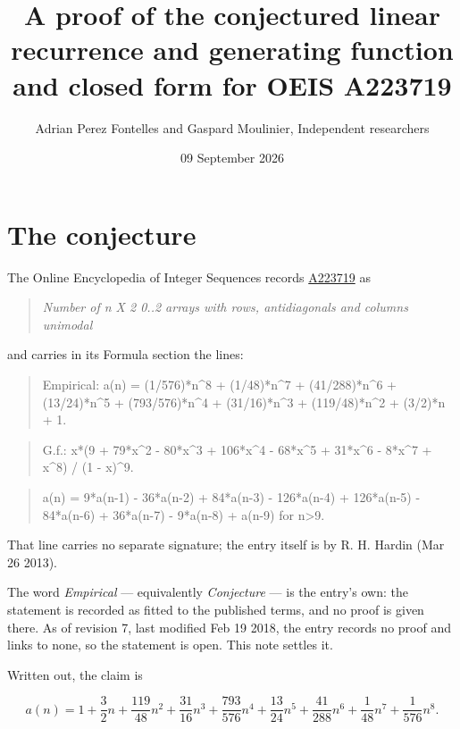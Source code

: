 \documentclass[11pt]{article}
\title{A proof of the conjectured linear recurrence and generating function and closed form for OEIS A223719}
\author{Adrian Perez Fontelles and Gaspard Moulinier, Independent researchers}
\date{09 September 2026}
\theoremstyle{definition}
\begin{document}
\maketitle
\section{The conjecture}

The Online Encyclopedia of Integer Sequences records \href{https://oeis.org/A223719}{A223719} as

\begin{quote}\itshape Number of n X 2 0..2 arrays with rows, antidiagonals and columns unimodal\end{quote}

and carries in its Formula section the lines:

\begin{quote}\ttfamily Empirical: a(n) = (1/576)*n\textasciicircum{}8 + (1/48)*n\textasciicircum{}7 + (41/288)*n\textasciicircum{}6 + (13/24)*n\textasciicircum{}5 + (793/576)*n\textasciicircum{}4 + (31/16)*n\textasciicircum{}3 + (119/48)*n\textasciicircum{}2 + (3/2)*n + 1.\end{quote}

\begin{quote}\ttfamily G.f.: x*(9 + 79*x\textasciicircum{}2 - 80*x\textasciicircum{}3 + 106*x\textasciicircum{}4 - 68*x\textasciicircum{}5 + 31*x\textasciicircum{}6 - 8*x\textasciicircum{}7 + x\textasciicircum{}8) / (1 - x)\textasciicircum{}9.\end{quote}

\begin{quote}\ttfamily a(n) = 9*a(n-1) - 36*a(n-2) + 84*a(n-3) - 126*a(n-4) + 126*a(n-5) - 84*a(n-6) + 36*a(n-7) - 9*a(n-8) + a(n-9) for n>9.\end{quote}

That line carries no separate signature; the entry itself is by R. H. Hardin (Mar 26 2013).

The word {\itshape Empirical} --- equivalently {\itshape Conjecture} --- is the entry's own: the statement is recorded as fitted to the published terms, and no proof is given there. As of revision 7, last modified Feb 19 2018, the entry records no proof and links to none, so the statement is open. This note settles it.

Written out, the claim is

\[a(n) = 1 + \frac{3}{2}n + \frac{119}{48}n^{2} + \frac{31}{16}n^{3} + \frac{793}{576}n^{4} + \frac{13}{24}n^{5} + \frac{41}{288}n^{6} + \frac{1}{48}n^{7} + \frac{1}{576}n^{8}.\]
\end{document}
